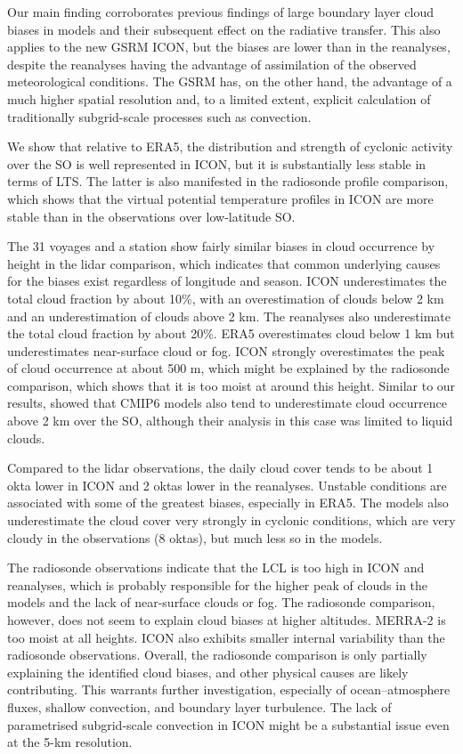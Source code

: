 \documentclass[12pt,a4paper]{article}
\begin{document}
Our main finding corroborates previous findings of large boundary layer cloud
biases in models and their subsequent effect on the radiative transfer. This
also applies to the new GSRM ICON, but the biases are lower than in the
reanalyses, despite the reanalyses having the advantage of assimilation of the
observed meteorological conditions.  The GSRM has, on the other hand, the
advantage of a much higher spatial resolution and, to a limited extent,
explicit calculation of traditionally subgrid-scale processes such as
convection.

We show that relative to ERA5, the distribution and strength of cyclonic
activity over the SO is well represented in ICON, but it is substantially less
stable in terms of LTS. The latter is also manifested in the radiosonde profile
comparison, which shows that the virtual potential temperature profiles in ICON
are more stable than in the observations over low-latitude SO.

The 31 voyages and a station show fairly similar biases in cloud occurrence by
height in the lidar comparison, which indicates that common underlying causes
for the biases exist regardless of longitude and season. ICON underestimates
the total cloud fraction by about 10\%, with an overestimation of clouds below
2 km and an underestimation of clouds above 2 km. The reanalyses also
underestimate the total cloud fraction by about 20\%.  ERA5 overestimates cloud
below 1 km but underestimates near-surface cloud or fog. ICON strongly
overestimates the peak of cloud occurrence at about 500 m, which might be
explained by the radiosonde comparison, which shows that it is too moist at
around this height.  Similar to our results, \cite{cesana2022} showed that
CMIP6 models also tend to underestimate cloud occurrence above 2 km over the
SO, although their analysis in this case was limited to liquid clouds.

Compared to the lidar observations, the daily cloud cover tends to be about 1
okta lower in ICON and 2 oktas lower in the reanalyses.  Unstable conditions
are associated with some of the greatest biases, especially in ERA5.  The
models also underestimate the cloud cover very strongly in cyclonic conditions,
which are very cloudy in the observations (8 oktas), but much less so in the
models.

The radiosonde observations indicate that the LCL is too high in ICON and
reanalyses, which is probably responsible for the higher peak of clouds in the
models and the lack of near-surface clouds or fog. The radiosonde comparison,
however, does not seem to explain cloud biases at higher altitudes.  MERRA-2 is
too moist at all heights.  ICON also exhibits smaller internal variability than
the radiosonde observations. Overall, the radiosonde comparison is only
partially explaining the identified cloud biases, and other physical causes are
likely contributing.  This warrants further investigation, especially of
ocean--atmosphere fluxes, shallow convection, and boundary layer turbulence.
The lack of parametrised subgrid-scale convection in ICON might be a
substantial issue even at the 5-km resolution.
\end{document}
